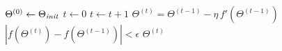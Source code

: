 \documentclass[10pt,oneside]{book}
\begin{document}
\pagestyle{empty}
\thispagestyle{empty}

\begin{codebox}
  \li $\Theta^{(0)} \gets \Theta_{\it init}$
  \li $t \gets 0$
  \li \Repeat
  \li   $t \gets t+1$
  \li   $\Theta^{(t)} = \Theta^{(t-1)} - \eta \, f'(\Theta^{(t-1)})$
  \li \Until $|f(\Theta^{(t)}) - f(\Theta^{(t-1)})| < \epsilon$
  \li \Return $\Theta^{(t)}$
\end{codebox}
\end{document}
